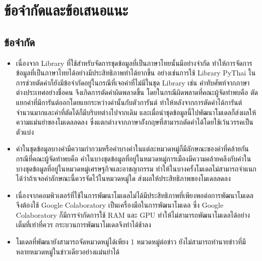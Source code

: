 \documentclass[12pt,oneside,openright,a4paper]{cpe-thai-project}
\begin{document}
\section{ข้อจำกัดและข้อเสนอแนะ}
  \subsection{ข้อจำกัด}
    \begin{itemize}
      \item เนื่องจาก Library ที่ใช้สำหรับจัดการชุดข้อมูลที่เป็นภาษาไทยนั้นมีอย่างจำกัด ทำให้การจัดการข้อมูลที่เป็นภาษาไทยได้อย่างมีประสิทธิภาพทำได้ยากขึ้น
            อย่างเช่นการใช้ Library PyThai ในการช่วยตัดคำก็ยังมีข้อจำกัดอยู่ในกรณีที่เจอคำที่ไม่มีในชุด Library เช่น คำทับศัพท์จากภาษาต่างประเทศอย่างชื่อคน
            จึงเกิดการตัดคำผิดพลาดขึ้น โดยในกรณีผิดพลาดที่คณะผู้จัดทำพบคือ ตัดแยกคำที่มีการันต์ออกโดยแยกระหว่างคำนั้นกับตัวการันต์ 
            ทำให้หลังจากการตัดคำได้การันต์จำนวนมากและคำที่ตัดได้ก็มีบริบทต่างไปจากเดิม และเมื่อนำชุดข้อมูลนี้ไปพัฒนาโมเดลก็ส่งผลให้ความแม่นยำของโมเดลลดลง 
            ซึ่งแตกต่างจากภาษาอัังกฤษที่สามารถตัดคำได้โดยใช้เว้นวรรคเป็นตัวแบ่ง
      \item คำในชุดข้อมูลบางคำมีความกำกวมหรือคำบางคำในแต่ละหมวดหมู่ก็มีลักษณะของคำที่คล้ายกัน กรณีที่คณะผู้จัดทำพบคือ 
            คำในบางชุดข้อมูลที่อยู่ในหมวดหมู่การเมืองมีความคล้ายคลึงกับคำในบางชุดข้อมูลที่อยู่ในหมวดหมู่เศรษฐกิจและอาชญากรรม 
            ทำให้ในบางครั้งโมเดลไม่สามารถจำแนกได้ว่าถ้าเจอคำลักษณะนี้ควรจัดไว้ในหมวดหมู่ใด ส่งผลให้ประสิทธิภาพของโมเดลลดลง
      \item เนื่องจากคอมพิวเตอร์ที่ใช้ในการพัฒนาโมเดลไม่ได้มีประสิทธิภาพที่เพียงพอต่อการพัฒนาโมเดล จึงต้องใช้ Google Colaboratory เป็นเครื่องมือในการพัฒนาโมเดล
            ซึ่ง Google Colaboratory ก็มีการจำกัดการใช้ RAM และ GPU ทำให้ไม่สามารถพัฒนาโมเดลได้อย่างเต็มที่เท่าที่ควร กระบวนการพัฒนาโมเดลจึงทำได้ช้าลง
      \item โมเดลที่พัฒนายังสามารถจัดหมวดหมู่ได้เพียง 1 หมวดหมู่ต่อข่าว ยังไม่สามารถทำนายข่าวที่มีหลายหมวดหมู่ในข่าวเดียวอย่างแม่นยำได้
    \end{itemize}
\end{document}
